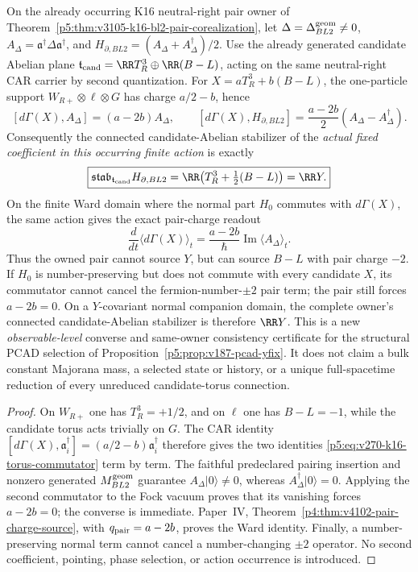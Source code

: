 \documentclass[12pt,a4paper]{article}
\begin{document}
\begin{theorem}
\label{p5:thm:v270-k16-action-hypercharge-ward}
On the already occurring K16 neutral-right pair owner of
Theorem~\ref{p5:thm:v3105-k16-bl2-pair-corealization}, let
\(\Delta=\Delta_{BL2}^{\rm geom}\ne0\),
\(A_\Delta=\mathfrak a^\dagger\Delta\mathfrak a^\dagger\), and
\(H_{\partial,BL2}=(A_\Delta+A_\Delta^\dagger)/2\).
Use the already generated candidate Abelian plane
\(\mathfrak t_{\rm cand}=\RR T_R^3\oplus\RR(B-L)\), acting
on the same neutral-right CAR carrier by second quantization.
For \(X=aT_R^3+b(B-L)\), the one-particle support
\(W_{R+}\otimes\ell\otimes G\) has charge \(a/2-b\), hence
\begin{equation}\label{p5:eq:v270-k16-torus-commutator}
\boxed{[d\Gamma(X),A_\Delta]=(a-2b)A_\Delta,\qquad
[d\Gamma(X),H_{\partial,BL2}]=\frac{a-2b}{2}
(A_\Delta-A_\Delta^\dagger).}
\end{equation}
Consequently the connected candidate-Abelian stabilizer of the
\emph{actual fixed coefficient in this occurring finite action} is exactly
\[
\boxed{\mathfrak{stab}_{\mathfrak t_{\rm cand}}H_{\partial,BL2}
=\RR\bigl(T_R^3+\tfrac12(B-L)\bigr)=\RR Y.}
\]
On the finite Ward domain where the normal part \(H_0\) commutes with
\(d\Gamma(X)\), the same action gives the exact pair-charge readout
\[
\boxed{\frac{d}{dt}\langle d\Gamma(X)\rangle_t
=\frac{a-2b}{\hbar}\operatorname{Im}\langle A_\Delta\rangle_t.}
\]
Thus the owned pair cannot source \(Y\), but can source \(B-L\)
with pair charge \(-2\). If \(H_0\) is number-preserving but does not
commute with every candidate \(X\), its commutator cannot cancel the
fermion-number-\(\pm2\) pair term; the pair still forces
\(a-2b=0\). On a \(Y\)-covariant normal companion domain, the complete
owner's connected candidate-Abelian stabilizer is therefore \(\RR Y\).
This is a new \emph{observable-level} converse and same-owner consistency
certificate for the structural PCAD selection of
Proposition~\ref{p5:prop:v187-pcad-yfix}. It does not claim a bulk
constant Majorana mass, a selected state or history, or a unique
full-spacetime reduction of every unreduced candidate-torus connection.
\end{theorem}
\begin{proof}
On \(W_{R+}\) one has \(T_R^3=+1/2\), and on
\(\ell\) one has \(B-L=-1\), while the candidate torus acts trivially
on \(G\). The CAR identity
\([d\Gamma(X),\mathfrak a_i^\dagger]=(a/2-b)\mathfrak a_i^\dagger\)
therefore gives the two identities
\eqref{p5:eq:v270-k16-torus-commutator} term by term.
The faithful predeclared pairing insertion and nonzero generated
\(M_{BL2}^{\rm geom}\) guarantee \(A_\Delta|0\rangle\ne0\),
whereas \(A_\Delta^\dagger|0\rangle=0\). Applying the second commutator
to the Fock vacuum proves that its vanishing forces \(a-2b=0\);
the converse is immediate. Paper~IV,
Theorem~\ref{p4:thm:v4102-pair-charge-source}, with
\(q_{\rm pair}=a-2b\), proves the Ward identity. Finally, a
number-preserving normal term cannot cancel a number-changing
\(\pm2\) operator. No second coefficient, pointing, phase selection,
or action occurrence is introduced.
\end{proof}
\end{document}
